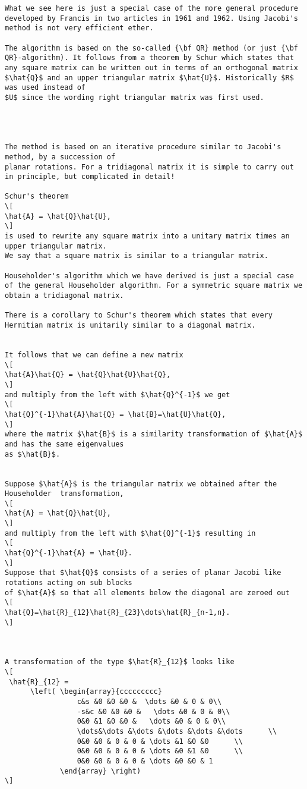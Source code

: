 {\begin{lstlisting}
What we see here is just a special case of the more general procedure 
developed by Francis in two articles in 1961 and 1962. Using Jacobi's method is not very efficient ether. 

The algorithm is based on the so-called {\bf QR} method (or just {\bf QR}-algorithm). It follows from a theorem by Schur which states that any square matrix can be written out in terms of an orthogonal matrix $\hat{Q}$ and an upper triangular matrix $\hat{U}$. Historically $R$ was used instead of 
$U$ since the wording right triangular matrix was first used.




The method is based on an iterative procedure similar to Jacobi's method, by a succession of
planar rotations. For a tridiagonal matrix it is simple to carry out in principle, but complicated in detail!

Schur's theorem
\[
\hat{A} = \hat{Q}\hat{U},
\]
is used to rewrite any square matrix into a unitary matrix times an upper triangular matrix.
We say that a square matrix is similar to a triangular matrix. 

Householder's algorithm which we have derived is just a special case of the general Householder algorithm. For a symmetric square matrix we obtain a tridiagonal matrix. 

There is a corollary to Schur's theorem which states that every Hermitian matrix is unitarily similar to a diagonal matrix.


It follows that we can define a new matrix
\[
\hat{A}\hat{Q} = \hat{Q}\hat{U}\hat{Q},
\]
and multiply from the left with $\hat{Q}^{-1}$ we get
\[
\hat{Q}^{-1}\hat{A}\hat{Q} = \hat{B}=\hat{U}\hat{Q},
\]
where the matrix $\hat{B}$ is a similarity transformation of $\hat{A}$ and has the same eigenvalues
as $\hat{B}$. 


Suppose $\hat{A}$ is the triangular matrix we obtained after the Householder  transformation,
\[
\hat{A} = \hat{Q}\hat{U},
\]
and multiply from the left with $\hat{Q}^{-1}$ resulting in
\[
\hat{Q}^{-1}\hat{A} = \hat{U}.
\]
Suppose that $\hat{Q}$ consists of a series of planar Jacobi like rotations acting on sub blocks
of $\hat{A}$ so that all elements below the diagonal are zeroed out
\[
\hat{Q}=\hat{R}_{12}\hat{R}_{23}\dots\hat{R}_{n-1,n}.
\]



A transformation of the type $\hat{R}_{12}$ looks like
\[
 \hat{R}_{12} =
      \left( \begin{array}{ccccccccc} 
                 c&s &0 &0 &0 &  \dots &0 & 0 & 0\\
                 -s&c &0 &0 &0 &   \dots &0 & 0 & 0\\
                 0&0 &1 &0 &0 &   \dots &0 & 0 & 0\\
                 \dots&\dots &\dots &\dots &\dots &\dots      \\
                 0&0 &0 & 0 & 0 & \dots &1 &0 &0      \\
                 0&0 &0 & 0 & 0 & \dots &0 &1 &0      \\
                 0&0 &0 & 0 & 0 & \dots &0 &0 & 1  
             \end{array} \right)
\]



\end{lstlisting}}
